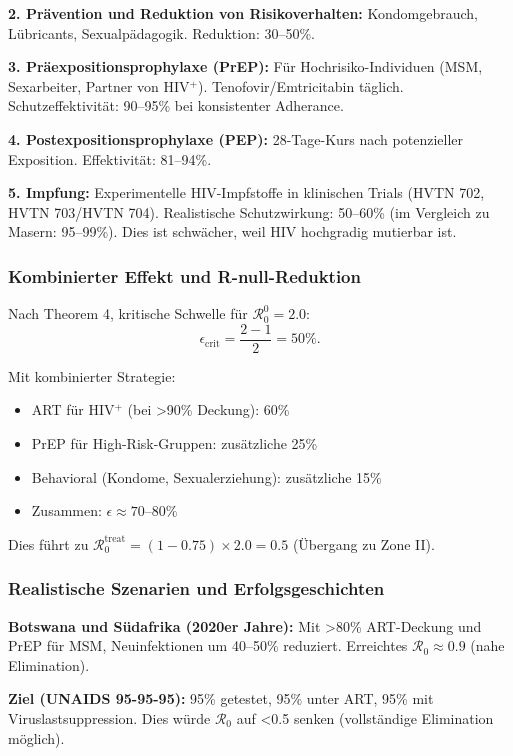 ﻿\documentclass[a4paper,12pt,twoside]{article}
\theoremstyle{definition}
\begin{document}
\textbf{2. Prävention und Reduktion von Risikoverhalten:} Kondomgebrauch, Lübricants, Sexualpädagogik. Reduktion: 30--50\%.

\textbf{3. Präexpositionsprophylaxe (PrEP):} Für Hochrisiko-Individuen (MSM, Sexarbeiter, Partner von HIV$^+$). Tenofovir/Emtricitabin täglich. Schutzeffektivität: 90--95\% bei konsistenter Adherance.

\textbf{4. Postexpositionsprophylaxe (PEP):} 28-Tage-Kurs nach potenzieller Exposition. Effektivität: 81--94\%.

\textbf{5. Impfung:} Experimentelle HIV-Impfstoffe in klinischen Trials (HVTN 702, HVTN 703/HVTN 704). Realistische Schutzwirkung: 50--60\% (im Vergleich zu Masern: 95--99\%). Dies ist schwächer, weil HIV hochgradig mutierbar ist.

\subsubsection{Kombinierter Effekt und R-null-Reduktion}

Nach Theorem 4, kritische Schwelle für $\mathcal{R}_0^0 = 2.0$:
\[
\epsilon_{\text{crit}} = \frac{2 - 1}{2} = 50\%.
\]

Mit kombinierter Strategie:
\begin{itemize}
\item ART für HIV$^+$ (bei >90\% Deckung): 60\%
\item PrEP für High-Risk-Gruppen: zusätzliche 25\%
\item Behavioral (Kondome, Sexualerziehung): zusätzliche 15\%
\item Zusammen: $\epsilon \approx 70 \text{--} 80\%$
\end{itemize}

Dies führt zu $\mathcal{R}_0^{\text{treat}} = (1 - 0.75) \times 2.0 = 0.5$ (Übergang zu Zone II).

\subsubsection{Realistische Szenarien und Erfolgsgeschichten}

\textbf{Botswana und Südafrika (2020er Jahre):} Mit >80\% ART-Deckung und PrEP für MSM, Neuinfektionen um 40--50\% reduziert. Erreichtes $\mathcal{R}_0 \approx 0.9$ (nahe Elimination).

\textbf{Ziel (UNAIDS 95-95-95):} 95\% getestet, 95\% unter ART, 95\% mit Viruslastsuppression. Dies würde $\mathcal{R}_0$ auf <0.5 senken (vollständige Elimination möglich).
\end{document}
